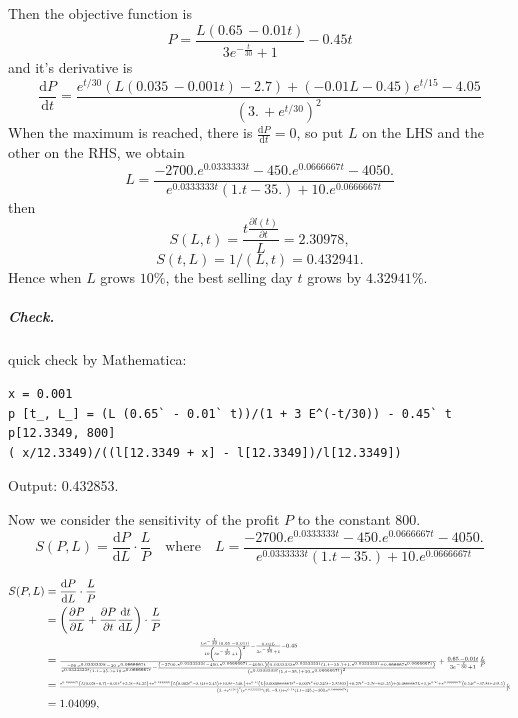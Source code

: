 \documentclass[11pt]{article}
\begin{document}
Then the objective function is 
$$
P= \frac{L (0.65\, -0.01 t)}{3 e^{-\frac{t}{30}}+1}-0.45 t
$$
and it's derivative is
$$
\frac{\mathrm dP}{\mathrm d t} = \frac{e^{t/30} (L (0.035\, -0.001 t)-2.7)+(-0.01 L-0.45) e^{t/15}-4.05}{\left(3.\, +e^{t/30}\right)^2}
$$
When the maximum is reached, there is $\frac{\mathrm dP}{\mathrm d t} = 0$, so put $L$ on the LHS and the other on the RHS, we obtain
$$
L = \frac{-2700. e^{0.0333333 t}-450. e^{0.0666667 t}-4050.}{e^{0.0333333 t} (1. t-35.)+10. e^{0.0666667 t}}
$$
then
$$
S(L,t) = \frac{t \frac{\partial l(t)}{\partial t}}{L} = 2.30978,
$$
$$
S(t,L) = 1/(L,t) = 0.432941.
$$
Hence when $L$ grows $10 \%$, the best selling day $t$ grows by $4.32941\%$.

\subparagraph{Check.} quick check by Mathematica:
\begin{lstlisting}
x = 0.001
p [t_, L_] = (L (0.65` - 0.01` t))/(1 + 3 E^(-t/30)) - 0.45` t
p[12.3349, 800]
( x/12.3349)/((l[12.3349 + x] - l[12.3349])/l[12.3349])
\end{lstlisting}

Output: 0.432853.


  Now we consider the sensitivity of the profit $P$ to the constant 800.
$$
S(P,L) = \frac{\mathrm d P}{\mathrm d L} \cdot \frac{L}{P} \quad \text{where}\quad  L = \frac{-2700. e^{0.0333333 t}-450. e^{0.0666667 t}-4050.}{e^{0.0333333 t} (1. t-35.)+10. e^{0.0666667 t}}
$$




$$
\begin{aligned}
S(P,L) &= \frac{\mathrm d P}{\mathrm d L} \cdot \frac{L}{P} \\
& = \left(\frac{\partial P}{\partial L} + \frac{\partial P}{\partial t}\frac{\mathrm d t}{\mathrm d L}\right)\cdot  \frac{L}{P} \\
& = 
\scalebox{0.7}{%
$\frac{\frac{L e^{-\frac{t}{30}} (0.65\, -0.01 t)}{10 \left(3 e^{-\frac{t}{30}}+1\right)^2}-\frac{0.01 L}{3 e^{-\frac{t}{30}}+1}-0.45}{\frac{-90. e^{0.0333333 t}-30. e^{0.0666667 t}}{e^{0.0333333 t} (1. t-35.)+10. e^{0.0666667 t}}-\frac{\left(-2700. e^{0.0333333 t}-450. e^{0.0666667 t}-4050.\right) \left(0.0333333 e^{0.0333333 t} (1. t-35.)+1. e^{0.0333333 t}+0.666667 e^{0.0666667 t}\right)}{\left(e^{0.0333333 t} (1. t-35.)+10. e^{0.0666667 t}\right)^2}}+\frac{0.65\, -0.01 t}{3 e^{-\frac{t}{30}}+1} \frac{L}{P}$}\\
& =
\scalebox{0.5}{%
$ \frac{e^{0.166667 t} \left(L (0.02 t-0.7)-0.01 t^2+2.5 t-84.25\right)+e^{0.133333 t} \left(L \left(0.002 t^2-0.14 t+2.45\right)+10.8 t-540.\right)+e^{0.1 t} \left(L \left(0.0000666667 t^3-0.007 t^2+0.245 t-2.85833\right)+0.27 t^2-2.7 t-641.25\right)+(0.0666667 L+3.) e^{0.2 t}+e^{0.0666667 t} \left(0.54 t^2-37.8 t+418.5\right)}{\left(3.\, +e^{t/30}\right)^2 \left(e^{0.0333333 t} (45.\, -9. t)+e^{0.1 t} (1. t-125.)-360. e^{0.0666667 t}\right)}  \frac{L}{P}$}\\
&  = 1.04099,
\end{aligned}
$$
\end{document}
